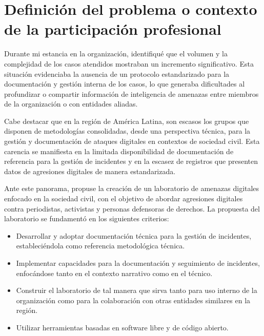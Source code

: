 \documentclass[12pt]{caltech_thesis}
\begin{document}

\chapter{Definición del problema o contexto de la participación profesional}

Durante mi estancia en la organización, identifiqué que el volumen y la complejidad de los casos atendidos mostraban un incremento significativo. Esta situación evidenciaba la ausencia de un protocolo estandarizado para la documentación y gestión interna de los casos, lo que generaba dificultades al profundizar o compartir información de inteligencia de amenazas entre miembros de la organización o con entidades aliadas.

Cabe destacar que en la región de América Latina, son escasos los grupos que disponen de metodologías consolidadas, desde una perspectiva técnica, para la gestión y documentación de ataques digitales en contextos de sociedad civil. Esta carencia se manifiesta en la limitada disponibilidad de documentación de referencia para la gestión de incidentes y en la escasez de registros que presenten datos de agresiones digitales de manera estandarizada.

Ante este panorama, propuse la creación de un laboratorio de amenazas digitales enfocado en la sociedad civil, con el objetivo de abordar agresiones digitales contra periodistas, activistas y personas defensoras de derechos. La propuesta del laboratorio se fundamentó en los siguientes criterios:

\begin{itemize}
    \item Desarrollar y adoptar documentación técnica para la gestión de incidentes, estableciéndola como referencia metodológica técnica.
    \item Implementar capacidades para la documentación y seguimiento de incidentes, enfocándose tanto en el contexto narrativo como en el técnico.
    \item Construir el laboratorio de tal manera que sirva tanto para uso interno de la organización como para la colaboración con otras entidades similares en la región.
    \item Utilizar herramientas basadas en software libre y de código abierto.
\end{itemize}
\end{document}
